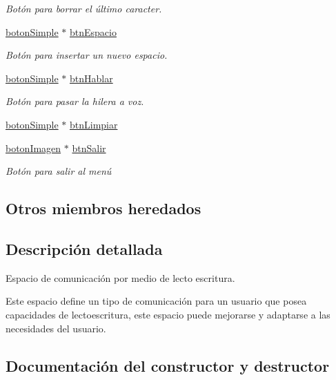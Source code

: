 \begin{DoxyCompactItemize}
\begin{DoxyCompactList}\small\item\em Botón para borrar el último caracter. \end{DoxyCompactList}\item 
\hyperlink{classboton_simple}{boton\+Simple} $\ast$ \hyperlink{classespacio_teclado_abf7bb12c95256d20e421831fea3d23e1}{btn\+Espacio}
\begin{DoxyCompactList}\small\item\em Botón para insertar un nuevo espacio. \end{DoxyCompactList}\item 
\hyperlink{classboton_simple}{boton\+Simple} $\ast$ \hyperlink{classespacio_teclado_a401d7d71c05c9f234010e33adfe51d04}{btn\+Hablar}
\begin{DoxyCompactList}\small\item\em Botón para pasar la hilera a voz. \end{DoxyCompactList}\item 
\hyperlink{classboton_simple}{boton\+Simple} $\ast$ \hyperlink{classespacio_teclado_a8178b42312d7b9930dac260664904c4c}{btn\+Limpiar}
\item 
\hyperlink{classboton_imagen}{boton\+Imagen} $\ast$ \hyperlink{classespacio_teclado_a82d9f915e17ee3491992da61a0d28a8f}{btn\+Salir}
\begin{DoxyCompactList}\small\item\em Botón para salir al menú \end{DoxyCompactList}\end{DoxyCompactItemize}
\subsection*{Otros miembros heredados}


\subsection{Descripción detallada}
Espacio de comunicación por medio de lecto escritura. 

Este espacio define un tipo de comunicación para un usuario que posea capacidades de lectoescritura, este espacio puede mejorarse y adaptarse a las necesidades del usuario. 

\subsection{Documentación del constructor y destructor}
\hypertarget{classespacio_teclado_a7bdaaa950b5673a464f322382aaf95cd}{}
